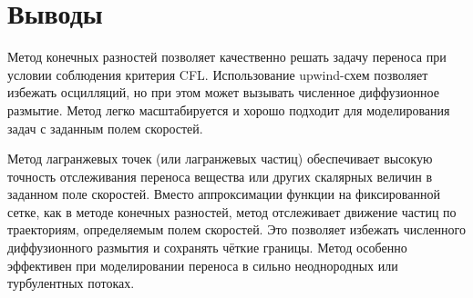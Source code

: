\newpage


\section{Выводы}

Метод конечных разностей позволяет качественно решать задачу переноса при условии соблюдения критерия CFL. Использование upwind-схем позволяет избежать осцилляций, но при этом может вызывать численное диффузионное размытие. Метод легко масштабируется и хорошо подходит для моделирования задач с заданным полем скоростей.

Метод лагранжевых точек (или лагранжевых частиц) обеспечивает высокую точность отслеживания переноса вещества или других скалярных величин в заданном поле скоростей. Вместо аппроксимации функции на фиксированной сетке, как в методе конечных разностей, метод отслеживает движение частиц по траекториям, определяемым полем скоростей. Это позволяет избежать численного диффузионного размытия и сохранять чёткие границы. Метод особенно эффективен при моделировании переноса в сильно неоднородных или турбулентных потоках.